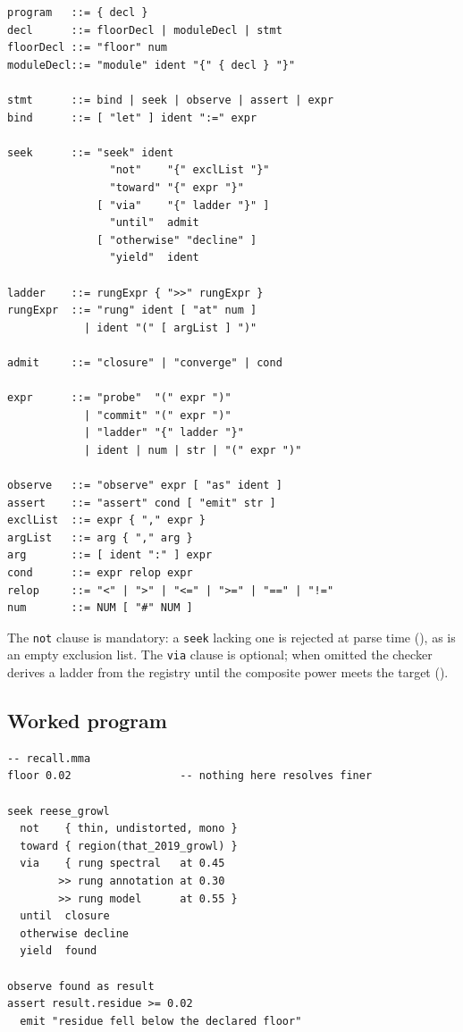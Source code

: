 \documentclass[11pt,twocolumn,a4paper]{article}
\theoremstyle{definition}
\theoremstyle{remark}
\begin{document}
\begin{lstlisting}[caption={Mishima grammar (EBNF).},label={lst:ebnf}]
program   ::= { decl }
decl      ::= floorDecl | moduleDecl | stmt
floorDecl ::= "floor" num
moduleDecl::= "module" ident "{" { decl } "}"

stmt      ::= bind | seek | observe | assert | expr
bind      ::= [ "let" ] ident ":=" expr

seek      ::= "seek" ident
                "not"    "{" exclList "}"
                "toward" "{" expr "}"
              [ "via"    "{" ladder "}" ]
                "until"  admit
              [ "otherwise" "decline" ]
                "yield"  ident

ladder    ::= rungExpr { ">>" rungExpr }
rungExpr  ::= "rung" ident [ "at" num ]
            | ident "(" [ argList ] ")"

admit     ::= "closure" | "converge" | cond

expr      ::= "probe"  "(" expr ")"
            | "commit" "(" expr ")"
            | "ladder" "{" ladder "}"
            | ident | num | str | "(" expr ")"

observe   ::= "observe" expr [ "as" ident ]
assert    ::= "assert" cond [ "emit" str ]
exclList  ::= expr { "," expr }
argList   ::= arg { "," arg }
arg       ::= [ ident ":" ] expr
cond      ::= expr relop expr
relop     ::= "<" | ">" | "<=" | ">=" | "==" | "!="
num       ::= NUM [ "#" NUM ]
\end{lstlisting}

The \texttt{not} clause is mandatory: a \texttt{seek} lacking one is rejected at
parse time (), as is an empty exclusion list. The
\texttt{via} clause is optional; when omitted the checker derives a ladder from
the registry until the composite power meets the target
().

\subsection{Worked program}

\begin{lstlisting}[caption={A complete mishima program.},label={lst:example}]
-- recall.mma
floor 0.02                 -- nothing here resolves finer

seek reese_growl
  not    { thin, undistorted, mono }
  toward { region(that_2019_growl) }
  via    { rung spectral   at 0.45
        >> rung annotation at 0.30
        >> rung model      at 0.55 }
  until  closure
  otherwise decline
  yield  found

observe found as result
assert result.residue >= 0.02
  emit "residue fell below the declared floor"
\end{lstlisting}
\end{document}
